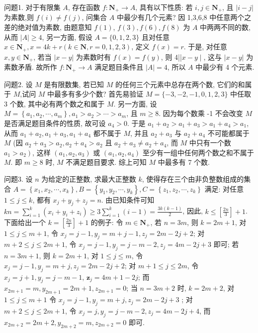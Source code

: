 
问题1. 对于有限集 $A$, 存在函数 $f: \mathbf{N}_{+} \rightarrow A$, 具有以下性质: 若 $i, j \in \mathbf{N}_{+}$, 且 $|i-j|$ 为素数,则 $f(i) \neq f(j)$, 问集合 $A$ 中最少有几个元素?
因 1,3,6,8 中任意两个之差的绝对值为素数, 由题意知 $f(1)$, $f(3), f(6), f(8)$ 为 $A$ 中两两不同的数, 从而 $|A| \geqslant 4$, 另一方面, 假设 $A= \{0,1,2,3\}$ 且对任意 $x \in \mathbf{N}_{+}, x=4 k+r(k \in \mathbf{N}, r=0,1,2,3)$, 定义 $f(x)=r$. 于是, 对任意 $x, y \in \mathbf{N}_{+}$, 若当 $|x-y|$ 为素数时有 $f(x)=f(y)$, 则 4||$x-y \mid$, 这与 $|x-y|$ 为素数矛盾.
故所作 $f: \mathbf{N}_{+} \rightarrow A$ 满足题目条件且 $|A|=4$, 所以 $A$ 中最少有 4 个元素.



问题2. 设 $M$ 是有限数集, 若已知 $M$ 的任何三个元素中总存在两个数, 它们的和属于 $M$,试问 $M$ 中最多有多少个数?
首先易验证 $M=\{-3,-2,-1,0,1,2,3\}$ 中任取 3 个数, 其中必有两个数之和属于 $M$. 另一方面, 设 $M=\left\{a_1, a_2, \cdots, a_m\right\}, a_1>a_2>\cdots> a_m$, 且 $m \geqslant 8$. 因为每个数乘 -1 不会改变 $M$ 是否满足题目条件的性质, 故可设 $a_4>0$. 于是 $a_1+a_2>a_1+a_3>a_1+a_4>a_1$, 从而 $a_1+a_2, a_1+a_3, a_1+a_4$ 都不属于 $M$, 并且 $a_2+a_3$ 与 $a_2+a_4$ 不可能都属于 $M$ (因 $a_2+a_3>a_2, a_2+ a_4>a_2$ 且 $a_2+a_3 \neq a_2+a_4$, 而 $M$ 中只有一个数 $\left.a_1>a_2\right)$, 这样 $\left(a_1, a_2, a_3\right)$ 或 $\left(a_1, a_2, a_4\right)$ 至少有一组中任何两个数之和不属于 $M$. 即 $m \geqslant 8$ 时, $M$ 不满足题目要求.
综上可知 $M$ 中最多有 7 个数.



问题3. 设 $n$ 为给定的正整数, 求最大正整数 $k$, 使得存在三个由非负整数组成的集合 $A=\left\{x_1, x_2, \cdots, x_k\right\}, B=\left\{y_1, y_2, \cdots, y_k\right\}, C=\left\{z_1, z_2, \cdots, z_k\right\}$ 满足: 对任意 $1 \leqslant j \leqslant k$, 都有 $x_j+y_j+z_j=n$.
由已知条件可知 $k n=\sum_{i=1}^k\left(x_i+y_i+z_i\right) \geqslant 3 \sum_{i=1}^k(i-1)=\frac{3 k(k-1)}{2}$, 因此, $k \leqslant\left[\frac{2 n}{3}\right]+1$. 下面给出一个 $k=\left[\frac{2 n}{3}\right]+1$ 的例子: 令 $m \in \mathbf{N}_{+}$, 若 $n= 3 m$, 则 $k=2 m+1$, 对 $1 \leqslant j \leqslant m+1$, 令 $x_j=j-1, y_j=m+j-1, z_j= 2 m-2 j+2$; 对 $m+2 \leqslant j \leqslant 2 m+1$, 令 $x_j=j-1, y_j=j-m-2, z_j=4 m- 2 j+3$ 即可; 若 $n=3 m+1$, 则 $k=2 m+1$, 对 $1 \leqslant j \leqslant m$, 令 $x_j=j-1, y_j= m+j, z_j=2 m-2 j+2$; 对 $m+1 \leqslant j \leqslant 2 m$, 令 $x_j=j+1, y_j=j-m-1$, $\boldsymbol{z}_j=4 m+1-2 j$; 而 $x_{2 m+1}=m, y_{2 m+1}=2 m+1, z_{2 m+1}=0$; 当 $n=3 m+2$ 时, $k=2 m+2$, 对 $1 \leqslant j \leqslant m+1$ 令 $x_j=j-1, y_j=m+j, z_j=2 m-2 j+3$ ; 对 $m+2 \leqslant j \leqslant 2 m+1$, 令 $x_j=j, y_j=j-m-2, z_j=4 m-2 j+4$, 而 $x_{2 m+2}=2 m+2, y_{2 m+2}=m, z_{2 m+2}=0$ 即可.



